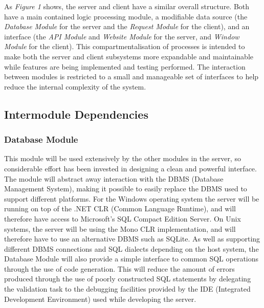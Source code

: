 As \emph{Figure 1} shows, the server and client have a similar overall structure. Both have a main contained logic processing module, a modifiable data source (the \emph{Database Module} for the server and the \emph{Request Module} for the client), and an interface (the \emph{API Module} and \emph{Website Module} for the server, and \emph{Window Module} for the client). This compartmentalisation of processes is intended to make both the server and client subsystems more expandable and maintainable while features are being implemented and testing performed. The interaction between modules is restricted to a small and manageable set of interfaces to help reduce the internal complexity of the system.

\subsection{Intermodule Dependencies}
\subsubsection{Database Module}
This module will be used extensively by the other modules in the server, so considerable effort has been invested in designing a clean and powerful interface. The module will abstract away interaction with the DBMS (Database Management System), making it possible to easily replace the DBMS used to support different platforms. For the Windows operating system the server will be running on top of the .NET CLR (Common Language Runtime), and will therefore have access to Microsoft's SQL Compact Edition Server. On Unix systems, the server will be using the Mono CLR implementation, and will therefore have to use an alternative DBMS such as SQLite. As well as supporting different DBMS connections and SQL dialects depending on the host system, the Database Module will also provide a simple interface to common SQL operations through the use of code generation. This will reduce the amount of errors produced through the use of poorly constructed SQL statements by delegating the validation task to the debugging facilities provided by the IDE (Integrated Development Environment) used while developing the server.

